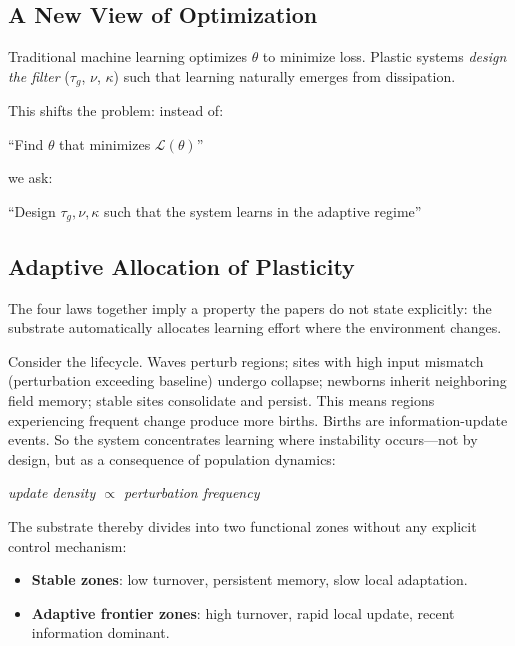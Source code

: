 \documentclass[11pt]{article}
\begin{document}
\subsection{A New View of Optimization}

Traditional machine learning optimizes $\theta$ to minimize loss. Plastic systems \emph{design the filter} ($\tau_g$, $\nu$, $\kappa$) such that learning naturally emerges from dissipation.

This shifts the problem: instead of:
\begin{center}
``Find $\theta$ that minimizes $\mathcal{L}(\theta)$''
\end{center}

we ask:
\begin{center}
``Design $\tau_g, \nu, \kappa$ such that the system learns in the adaptive regime''
\end{center}

\subsection{Adaptive Allocation of Plasticity}

The four laws together imply a property the papers do not state explicitly: the substrate automatically allocates learning effort where the environment changes.

Consider the lifecycle. Waves perturb regions; sites with high input mismatch (perturbation exceeding baseline) undergo collapse; newborns inherit neighboring field memory; stable sites consolidate and persist. This means regions experiencing frequent change produce more births. Births are information-update events. So the system concentrates learning where instability occurs---not by design, but as a consequence of population dynamics:

\begin{center}
\textit{update density $\propto$ perturbation frequency}
\end{center}

The substrate thereby divides into two functional zones without any explicit control mechanism:
\begin{itemize}
\item \textbf{Stable zones}: low turnover, persistent memory, slow local adaptation.
\item \textbf{Adaptive frontier zones}: high turnover, rapid local update, recent information dominant.
\end{itemize}
\end{document}
